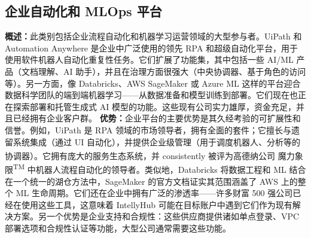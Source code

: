 \documentclass[11pt, a4paper, oneside]{article}
\begin{document}
\subsection{企业自动化和 MLOps 平台}

\textbf{概述：}此类别包括企业流程自动化和机器学习运营领域的大型参与者。UiPath 和 Automation Anywhere 是企业中广泛使用的领先 RPA 和超级自动化平台，用于使用软件机器人自动化重复性任务。它们扩展了功能集，其中包括一些 AI/ML 产品（文档理解、AI 助手），并且在治理方面很强大（中央协调器、基于角色的访问等）。另一方面，像 Databricks、AWS SageMaker 或 Azure ML 这样的平台迎合数据科学团队的端到端机器学习——从数据准备和模型训练到部署。它们现在也正在探索部署和托管生成式 AI 模型的功能。这些现有公司实力雄厚，资金充足，并且已经拥有企业客户群。
\newline\newline
\textbf{优势：}企业平台的主要优势是其久经考验的可扩展性和信誉。例如，UiPath 是 RPA 领域的市场领导者，拥有全面的套件；它擅长与遗留系统集成（通过 UI 自动化），并提供企业级管理（用于调度机器人、分析等的协调器）。它拥有庞大的服务生态系统，并 consistently 被评为高德纳公司\textsuperscript{\textregistered} 魔力象限\textsuperscript{TM} 中机器人流程自动化的领导者\cite{uipathGartner}。类似地，Databricks 将数据工程和 ML 结合在一个统一的湖仓方法中，SageMaker 的官方文档证实其范围涵盖了 AWS 上的整个 ML 生命周期\cite{awsSagemaker}。它们还在企业中拥有广泛的渗透率——许多财富 500 强公司已经在使用这些工具，这意味着 IntellyHub 可能在目标账户中遇到它们作为现有解决方案。另一个优势是企业支持和合规性：这些供应商提供诸如单点登录、VPC 部署选项和合规性认证等功能，大型公司通常需要这些功能。
\newline\newline
\end{document}
